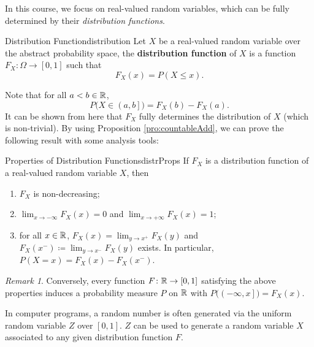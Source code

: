 \documentclass[math, code]{amznotes}
\theoremstyle{remark}
\newtheorem*{remark}{Remark}
\begin{document}
In this course, we focus on real-valued random variables, which can be fully determined by their \textit{distribution functions}.
\begin{dfnbox}{Distribution Function}{distribution}
    Let $X$ be a real-valued random variable over the abstract probability space, the {\color{red} \textbf{distribution function}} of $X$ is a function $F_X \colon \Omega \to \left[0, 1\right]$ such that 
    \begin{equation*}
        F_X\left(x\right) = P\left(X \leq x\right).
    \end{equation*}
\end{dfnbox}
Note that for all $a < b \in \mathbb{R}$, 
\begin{equation*}
    P\bigl(X \in \left(a, b\right]\bigr) = F_X\left(b\right) - F_X\left(a\right).
\end{equation*}
It can be shown from here that $F_X$ fully determines the distribution of $X$ (which is non-trivial). By using Proposition \ref{pro:countableAdd}, we can prove the following result with some analysis tools:
\begin{probox}{Properties of Distribution Functions}{distrProps}
    If $F_X$ is a distribution function of a real-valued random variable $X$, then 
    \begin{enumerate}
        \item $F_X$ is non-decreasing;
        \item $\lim_{x \to -\infty}F_X\left(x\right) = 0$ and $\lim_{x \to +\infty}F_X\left(x\right) = 1$;
        \item for all $x \in \mathbb{R}$, $F_X\left(x\right) = \lim_{y \to x^+}F_X\left(y\right)$ and $F_X\left(x^-\right) \coloneqq \lim_{y \to x^-}F_X\left(y\right)$ exists. In particular, $P\left(X = x\right) = F_X\left(x\right) - F_X\left(x^-\right)$.
    \end{enumerate}
\end{probox}
\begin{notebox}
    \begin{remark}
        Conversely, every function $F \colon \mathbb{R} \to \left[0, 1\right]$ satisfying the above properties induces a probability measure $P$ on $\mathbb{R}$ with $P\bigl(\left(-\infty, x\right]\bigr) = F_X\left(x\right)$.
    \end{remark}
\end{notebox}
In computer programs, a random number is often generated via the uniform random variable $Z$ over $\left[0, 1\right]$. $Z$ can be used to generate a random variable $X$ associated to any given distribution function $F$.
\end{document}
